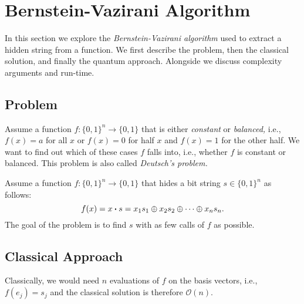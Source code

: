 	\section{Bernstein-Vazirani Algorithm} %
		\label{sec:bernsteinVazirani}

		In this section we explore the \emph{Bernstein-Vazirani algorithm} used to extract a hidden string from a function. We first describe the problem, then the classical solution, and finally the quantum approach. Alongside we discuss complexity arguments and run-time.

		\subsection{Problem}
			Assume a function \( f : \{ 0, 1 \}^n \to \{ 0, 1 \} \) that is either \emph{constant} or \emph{balanced,} i.e., \( f(x) = a \) for all \(x\) or \( f(x) = 0 \) for half \(x\) and \( f(x) = 1 \) for the other half. We want to find out which of these cases \(f\) falls into, i.e., whether \(f\) is constant or balanced. This problem is also called \emph{Deutsch's problem.}

			Assume a function \( f : \{ 0, 1 \}^n \to \{ 0, 1 \} \) that hides a bit string \( s \in \{ 0, 1 \}^n \) as follows:
			\begin{equation}
				f(x) = x \dotproduct s = x_1 s_1 \oplus x_2 s_2 \oplus \dots \oplus x_n s_n.
			\end{equation}
			The goal of the problem is to find \(s\) with as few calls of \(f\) as possible.

		\subsection{Classical Approach}
			Classically, we would need \(n\) evaluations of \(f\) on the basis vectors, i.e., \( f(e_j) = s_j \) and the classical solution is therefore \(\mathcal{O}(n)\).

